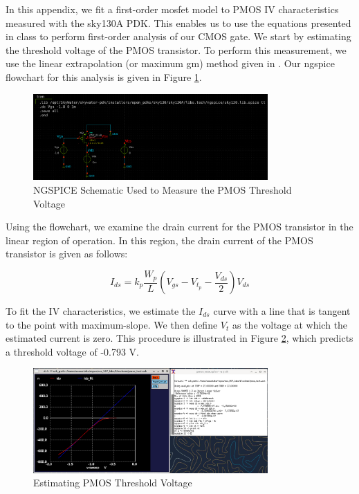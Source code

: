 \documentclass{article}
\begin{document}
	In this appendix, we fit a first-order mosfet model to PMOS IV characteristics measured with the sky130A PDK. This enables us to use the equations presented in class to perform first-order analysis of our CMOS gate. We start by estimating the threshold voltage of the PMOS transistor. To perform this measurement, we use the linear extrapolation (or maximum gm) method given in \cite{cmos_vlsi_design}. Our ngspice flowchart for this analysis is given in Figure \ref{fig::pmos_vt_meas_schem}.
	
	\begin{figure}[H]
		\centerline{\includegraphics[width=0.8\textwidth]{pmos_vt_meas_schem.png}}
		\caption{NGSPICE Schematic Used to Measure the PMOS Threshold Voltage}
		\label{fig::pmos_vt_meas_schem}
	\end{figure}
	
	\noindent Using the flowchart, we examine the drain current for the PMOS transistor in the linear region of operation. In this region, the drain current of the PMOS transistor is given as follows:
	
	\begin{equation}
		I_{ds} = k_p\frac{W_p}{L}\left(V_{gs} - V_{t_p} - \frac{V_{ds}}{2}\right)V_{ds}
	\end{equation}
	
	\noindent To fit the IV characteristics, we estimate the $I_{ds}$ curve with a line that is tangent to the point with maximum-slope. We then define $V_t$ as the voltage at which the estimated current is zero. This procedure is illustrated in Figure \ref{fig::pmos_vt_meas}, which predicts a threshold voltage of -0.793 V.
	
	\begin{figure}[H]
		\centerline{\includegraphics[width=0.8\textwidth]{pmos_vt_meas.png}}
		\caption{Estimating PMOS Threshold Voltage}
		\label{fig::pmos_vt_meas}
	\end{figure}
	
\end{document}
